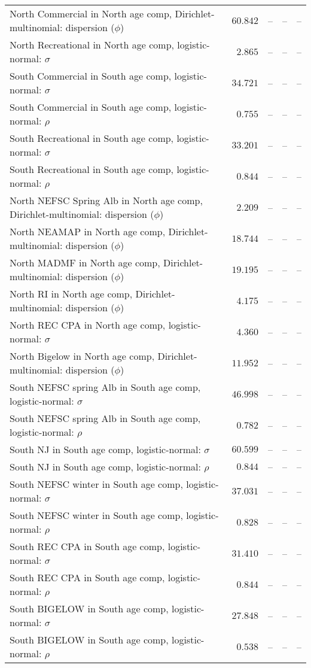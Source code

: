 \documentclass[
]{article}
\begin{document}
\begin{landscape}
\begin{longtable}[t]{lrrrr}
North Commercial in North age comp, Dirichlet-multinomial: dispersion ($\phi$) & $60.842$ & -- & -- & --\\
\addlinespace
North Recreational in North age comp, logistic-normal: $\sigma$ & $2.865$ & -- & -- & --\\
South Commercial in South age comp, logistic-normal: $\sigma$ & $34.721$ & -- & -- & --\\
South Commercial in South age comp, logistic-normal: $\rho$ & $0.755$ & -- & -- & --\\
South Recreational in South age comp, logistic-normal: $\sigma$ & $33.201$ & -- & -- & --\\
South Recreational in South age comp, logistic-normal: $\rho$ & $0.844$ & -- & -- & --\\
\addlinespace
North NEFSC Spring Alb in North age comp, Dirichlet-multinomial: dispersion ($\phi$) & $2.209$ & -- & -- & --\\
North NEAMAP in North age comp, Dirichlet-multinomial: dispersion ($\phi$) & $18.744$ & -- & -- & --\\
North MADMF in North age comp, Dirichlet-multinomial: dispersion ($\phi$) & $19.195$ & -- & -- & --\\
North RI in North age comp, Dirichlet-multinomial: dispersion ($\phi$) & $4.175$ & -- & -- & --\\
North REC CPA in North age comp, logistic-normal: $\sigma$ & $4.360$ & -- & -- & --\\
\addlinespace
North Bigelow in North age comp, Dirichlet-multinomial: dispersion ($\phi$) & $11.952$ & -- & -- & --\\
South NEFSC spring Alb in South age comp, logistic-normal: $\sigma$ & $46.998$ & -- & -- & --\\
South NEFSC spring Alb in South age comp, logistic-normal: $\rho$ & $0.782$ & -- & -- & --\\
South NJ in South age comp, logistic-normal: $\sigma$ & $60.599$ & -- & -- & --\\
South NJ in South age comp, logistic-normal: $\rho$ & $0.844$ & -- & -- & --\\
\addlinespace
South NEFSC winter in South age comp, logistic-normal: $\sigma$ & $37.031$ & -- & -- & --\\
South NEFSC winter in South age comp, logistic-normal: $\rho$ & $0.828$ & -- & -- & --\\
South REC CPA in South age comp, logistic-normal: $\sigma$ & $31.410$ & -- & -- & --\\
South REC CPA in South age comp, logistic-normal: $\rho$ & $0.844$ & -- & -- & --\\
South BIGELOW in South age comp, logistic-normal: $\sigma$ & $27.848$ & -- & -- & --\\
\addlinespace
South BIGELOW in South age comp, logistic-normal: $\rho$ & $0.538$ & -- & -- & --\\*
\end{longtable}
\end{landscape}
\end{document}

